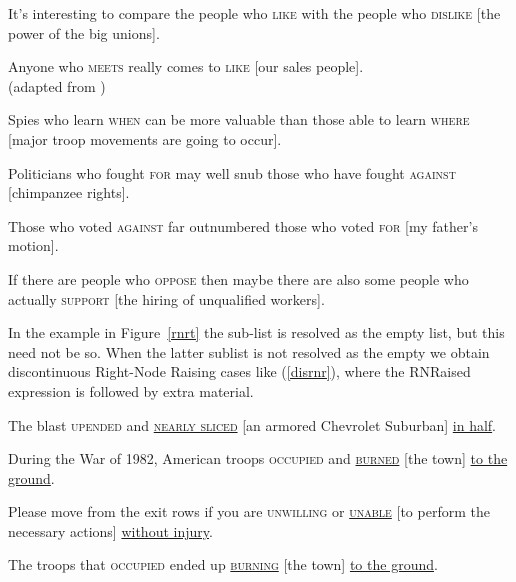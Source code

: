 \documentclass[output=paper]{langsci/langscibook}
\begin{document}
\begin{exe}
\ex \begin{xlista}
\ex  It's interesting to compare the people who \textsc{like} with the people
       who \textsc{dislike} [the power of the big unions].\\
       \citep[550]{hudson}

 \ex Anyone  who \textsc{meets} really comes to \textsc{like} [our sales people].\\
 (adapted from \citet{
williams})\label{will}


\ex   Spies who learn \textsc{when} can be more valuable than those
able to learn \textsc{where} [major troop movements are going to occur].

\ex Politicians who fought \textsc{for} may well snub those
 who have fought \textsc{against} [chimpanzee rights]. \\
\citep{postal94}

\ex Those who voted \textsc{against} far outnumbered those who
voted  \textsc{for} [my father's motion].\\
\citep[1344]{rodney2}


\ex If there are people who \textsc{oppose} then maybe there are also some
  people who actually \textsc{support}  [the hiring of unqualified
  workers].\\
  \citep{chavesrnr}

\end{xlista}


\end{exe}




In the example in Figure~\ref{rnrt}  the sub-list  is resolved as the empty list, but this need not be so. When the latter sublist is not resolved as the empty we obtain discontinuous Right-Node Raising cases like (\ref{disrnr}), 
where the RNRaised expression is followed by extra material.


\begin{exe}
\ex \begin{xlista}
\ex The blast \textsc{upended} and \underline{\textsc{nearly sliced}} [an armored Chevrolet Suburban] \underline{in half}.

\ex During the War of 1982, American troops
\textsc{occupied}  and \underline{\textsc{burned}} [the town] \underline{to the ground}.

\ex Please move from the exit rows if you are \textsc{unwilling} or \underline{\textsc{unable}}
 [to perform the necessary actions] \underline{without injury}.

\ex The troops that \textsc{occupied} ended up \underline{\textsc{burning}}
[the town] \underline{to the ground}.

\end{xlista}\label{disrnr}
\end{exe}
\end{document}
